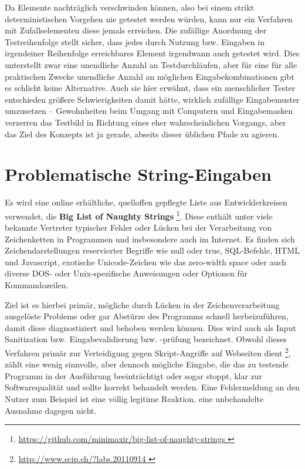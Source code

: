 Da Elemente nachträglich verschwinden können, also bei einem strikt
deterministischen Vorgehen nie getestet werden würden, kann nur ein
Verfahren mit Zufallselementen diese jemals erreichen. Die zufällige
Anordnung der Testreihenfolge stellt sicher, dass jedes durch Nutzung 
bzw. Eingaben in irgendeiner Reihenfolge erreichbares Element
irgendwann auch getestet wird. Dies unterstellt zwar eine unendliche
Anzahl an Testdurchläufen, aber für eine für alle praktischen Zwecke
unendliche Anzahl an möglichen Eingabekombinationen gibt es schlicht
keine Alternative. Auch sie hier erwähnt, dass ein menschlicher Tester
entschieden größere Schwierigkeiten damit hätte, wirklich zufällige
Eingabemuster umzusetzen -- Gewohnheiten beim Umgang mit Computern
und Eingabemasken verzerren das Testbild in Richtung eines eher
wahrscheinlichen Vorgangs, aber das Ziel des Konzepts ist ja gerade,
abseits dieser üblichen Pfade zu agieren.


\section{Problematische String-Eingaben}\label{section:naughtystrings}

Es wird eine online erhältliche, quelloffen gepflegte Liste aus Entwicklerkreisen verwendet, 
die \textbf{Big List of Naughty Strings} \footnote{\url{ https://github.com/minimaxir/big-list-of-naughty-strings }}. Diese enthält unter viele bekannte
Vertreter typischer Fehler oder Lücken bei der Verarbeitung von Zeichenketten in Programmen und
insbesondere auch im Internet. Es finden sich Zeichendarstellungen reservierter Begriffe wie
\glqq{}null\grqq{} oder \glqq{}true\grqq{}, SQL-Befehle, HTML und Javascript, exotische Unicode-Zeichen wie das
\glqq{}zero-width space\grqq{} \cite{unicodezerowidth} oder auch diverse DOS- oder Unix-spezifische
Anweisungen oder Optionen für Kommandozeilen.

Ziel ist es hierbei primär, mögliche durch Lücken in der Zeichenverarbeitung ausgelöste Probleme oder gar
Abstürze des Programms schnell herbeizuführen, damit diese diagnostiziert und behoben werden können.
Dies wird auch als \glqq{}Input Sanitization\grqq{} bzw. Eingabevalidierung bzw. -prüfung bezeichnet. 
Obwohl dieses Verfahren primär zur Verteidigung gegen Skript-Angriffe auf Webseiten dient
\footnote{\url{ http://www.scip.ch/?labs.20110914 }}, 
zählt eine wenig sinnvolle, aber dennoch mögliche Eingabe, 
die das zu testende Programm in der Ausführung beeinträchtigt oder sogar stoppt, klar zur 
Softwarequalität und sollte korrekt behandelt werden. Eine Fehlermeldung an den Nutzer zum
Beispiel ist eine völlig legitime Reaktion, eine unbehandelte Ausnahme dagegen nicht.


